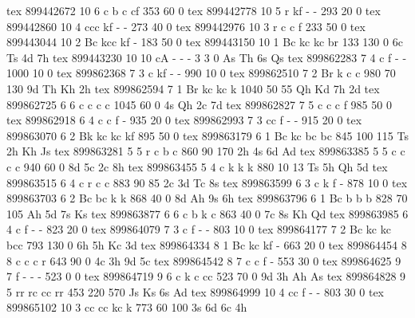tex       899442672 10  6 c   b     c     cf         353   60    0 
tex       899442778 10  5 r   kf    -     -          293   20    0 
tex       899442860 10  4 ccc kf    -     -          273   40    0 
tex       899442976 10  3 r   c     c     f          233   50    0 
tex       899443044 10  2 Bc  kcc   kf    -          183   50    0 
tex       899443150 10  1 Bc  kc    kc    br         133  130    0 6c Ts 4d 7h
tex       899443230 10 10 cA  -     -     -            3    3    0 As Th 6s Qs
tex       899862283  7  4 c   f     -     -         1000   10    0 
tex       899862368  7  3 c   kf    -     -          990   10    0 
tex       899862510  7  2 Br  k     c     c          980   70  130 9d Th Kh 2h
tex       899862594  7  1 Br  kc    kc    k         1040   50   55 Qh Kd 7h 2d
tex       899862725  6  6 c   c     c     c         1045   60    0 4s Qh 2c 7d
tex       899862827  7  5 c   c     c     f          985   50    0 
tex       899862918  6  4 c   c     f     -          935   20    0 
tex       899862993  7  3 cc  f     -     -          915   20    0 
tex       899863070  6  2 Bk  kc    kc    kf         895   50    0 
tex       899863179  6  1 Bc  kc    bc    bc         845  100  115 Ts 2h Kh Js
tex       899863281  5  5 r   c     b     c          860   90  170 2h 4s 6d Ad
tex       899863385  5  5 c   c     c     c          940   60    0 8d 5c 2c 8h
tex       899863455  5  4 c   k     k     k          880   10   13 Ts 5h Qh 5d
tex       899863515  6  4 c   r     c     c          883   90   85 2c 3d Tc 8s
tex       899863599  6  3 c   k     f     -          878   10    0 
tex       899863703  6  2 Bc  bc    k     k          868   40    0 8d Ah 9s 6h
tex       899863796  6  1 Bc  b     b     b          828   70  105 Ah 5d 7s Ks
tex       899863877  6  6 c   b     k     c          863   40    0 7c 8s Kh Qd
tex       899863985  6  4 c   f     -     -          823   20    0 
tex       899864079  7  3 c   f     -     -          803   10    0 
tex       899864177  7  2 Bc  kc    kc    bcc        793  130    0 6h 5h Kc 3d
tex       899864334  8  1 Bc  kc    kf    -          663   20    0 
tex       899864454  8  8 c   c     c     r          643   90    0 4c 3h 9d 5c
tex       899864542  8  7 c   c     f     -          553   30    0 
tex       899864625  9  7 f   -     -     -          523    0    0 
tex       899864719  9  6 c   k     c     cc         523   70    0 9d 3h Ah As
tex       899864828  9  5 rr  rc    cc    rr         453  220  570 Js Ks 6s Ad
tex       899864999 10  4 cc  f     -     -          803   30    0 
tex       899865102 10  3 cc  cc    kc    k          773   60  100 3s 6d 6c 4h
